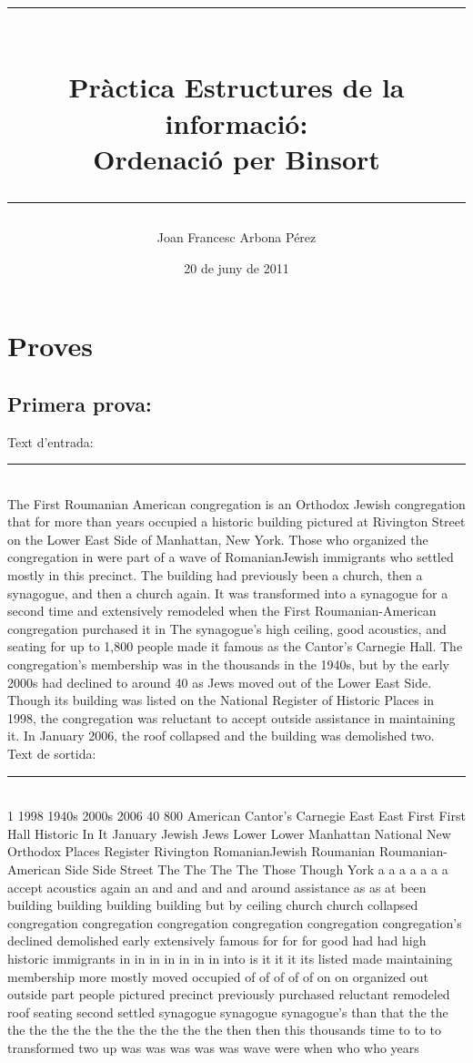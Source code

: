 \documentclass[a4paper,10pt]{article}
\title{ \rule{100mm}{0.3mm} \\ \vspace{3 mm} Pràctica Estructures de la informació:
\\ \textbf{Ordenació per Binsort} \rule{100mm}{0.3mm} }
\author{Joan Francesc Arbona Pérez}
\date{20 de juny de 2011}
\begin{document}
\maketitle
\newpage
\section{Proves}
\subsection{Primera prova:}
\vspace{5mm}
 Text d'entrada: \newline \rule[3mm]{120mm}{0.1mm}  \\[2 mm]
The First Roumanian American congregation is an Orthodox Jewish congregation
that for more than years occupied a historic building pictured at Rivington
Street on the Lower East Side of Manhattan, New York. Those who organized the
congregation in were part of a wave of RomanianJewish immigrants who settled
mostly in this precinct. The building had previously been a church, then a
synagogue, and then a church again. It was transformed into a synagogue for a
second time and extensively remodeled when the First Roumanian-American
congregation purchased it in The synagogue's high ceiling, good acoustics, and
seating for up to 1,800 people made it famous as the Cantor's Carnegie Hall. The
congregation's membership was in the thousands in the 1940s, but by the early
2000s had declined to around 40 as Jews moved out of the Lower East Side. Though
its building was listed on the National Register of Historic Places in 1998, the
congregation was reluctant to accept outside assistance in maintaining it. In
January 2006, the roof collapsed and the building was demolished two.
\\[10 mm]
Text de sortida:  \newline \rule[3mm]{120mm}{0.1mm}  \\[2 mm]
1 1998 1940s 2000s 2006 40 800 American Cantor's Carnegie East East First First
Hall Historic In It January Jewish Jews Lower Lower Manhattan National New
Orthodox Places Register Rivington RomanianJewish Roumanian Roumanian-American
Side Side Street The The The The Those Though York a a a a a a a accept
acoustics again an and and and and around assistance as as at been building
building building building but by ceiling church church collapsed congregation
congregation congregation congregation congregation congregation's declined
demolished early extensively famous for for for good had had high historic
immigrants in in in in in in in into is it it it its listed made maintaining
membership more mostly moved occupied of of of of of on on organized out outside
part people pictured precinct previously purchased reluctant remodeled roof
seating second settled synagogue synagogue synagogue's than that the the the the
the the the the the the the the then then this thousands time to to to
transformed two up was was was was was wave were when who who years
\end{document}
